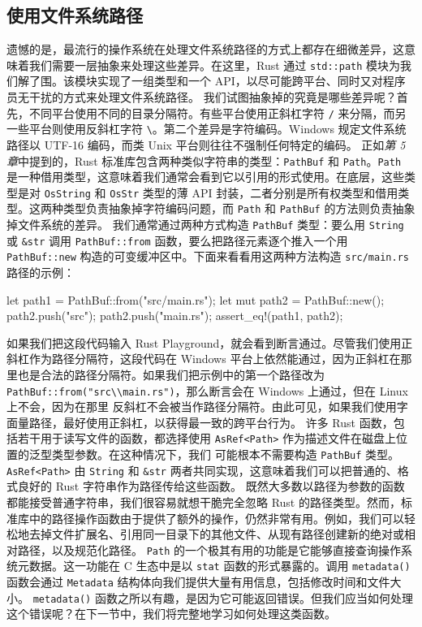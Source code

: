 \subsection{使用文件系统路径}
\label{idx:idx_3be63d99}
遗憾的是，最流行的操作系统在处理文件系统路径的方式上都存在细微差异，这意味着我们需要一层抽象来处理这些差异。在这里，Rust 通过 \texttt{std::path} 模块为我们解了围。该模块实现了一组类型和一个 API，以尽可能跨平台、同时又对程序员无干扰的方式来处理文件系统路径。
我们试图抽象掉的究竟是哪些差异呢？首先，不同平台使用不同的目录分隔符。有些平台使用正斜杠字符 \texttt{/} 来分隔，而另一些平台则使用反斜杠字符 \texttt{\textbackslash{}}。第二个差异是字符编码。Windows 规定文件系统路径以 UTF-\allowbreak{}16 编码，而类 Unix 平台则往往不强制任何特定的编码。
正如\emph{第 5 章}中提到的，Rust 标准库包含两种类似字符串的类型：\texttt{PathBuf} 和 \texttt{Path}。\texttt{Path} 是一种借用类型，这意味着我们通常会看到它以引用的形式使用。在底层，这些类型是对 \texttt{OsString} 和 \texttt{OsStr} 类型的薄 API 封装，二者分别是所有权类型和借用类型。这两种类型负责抽象掉字符编码问题，而 \texttt{Path} 和 \texttt{PathBuf} 的方法则负责抽象掉文件系统的差异。
我们通常通过两种方式构造 \texttt{PathBuf} 类型：要么用 \texttt{String} 或 \texttt{\&str} 调用 \texttt{PathBuf::\allowbreak{}from} 函数，要么把路径元素逐个推入一个用
\texttt{PathBuf::\allowbreak{}new} 构造的可变缓冲区中。下面来看看用这两种方法构造 \texttt{src/main.rs} 路径的示例：
\begin{codebox}[rust]
let path1 = PathBuf::from("src/main.rs");
let mut path2 = PathBuf::new();
path2.push("src");
path2.push("main.rs");
assert_eq!(path1, path2);
\end{codebox}
如果我们把这段代码输入 Rust Playground，就会看到断言通过。尽管我们使用正斜杠作为路径分隔符，这段代码在 Windows 平台上依然能通过，因为正斜杠在那里也是合法的路径分隔符。如果我们把示例中的第一个路径改为
\texttt{PathBuf::\allowbreak{}from(\allowbreak{}"src\textbackslash{}\textbackslash{}main.\allowbreak{}rs")\allowbreak{}}，那么断言会在 Windows 上通过，但在 Linux 上不会，因为在那里
反斜杠不会被当作路径分隔符。由此可见，如果我们使用字面量路径，最好使用正斜杠，以获得最一致的跨平台行为。
\label{idx:idx_e5f4ccbf}
许多 Rust 函数，包括若干用于读写文件的函数，都选择使用
\texttt{AsRef<Path>} 作为描述文件在磁盘上位置的泛型类型参数。在这种情况下，我们
可能根本不需要构造 \texttt{PathBuf} 类型。\texttt{AsRef<Path>} 由 \texttt{String} 和 \texttt{\&str} 两者共同实现，这意味着我们可以把普通的、格式良好的 Rust 字符串作为路径传给这些函数。
\label{idx:idx_391f1682}
既然大多数以路径为参数的函数都能接受普通字符串，我们很容易就想干脆完全忽略 Rust 的路径类型。然而，标准库中的路径操作函数由于提供了额外的操作，仍然非常有用。例如，我们可以轻松地去掉文件扩展名、引用同一目录下的其他文件、从现有路径创建新的绝对或相对路径，以及规范化路径。
\texttt{Path} 的一个极其有用的功能是它能够直接查询操作系统元数据。这一功能在 C 生态中是以 \texttt{stat} 函数的形式暴露的。调用 \texttt{metadata()} 函数会通过 \texttt{Metadata} 结构体向我们提供大量有用信息，包括修改时间和文件大小。
\texttt{metadata()} 函数之所以有趣，是因为它可能返回错误。但我们应当如何处理这个错误呢？在下一节中，我们将完整地学习如何处理这类函数。
